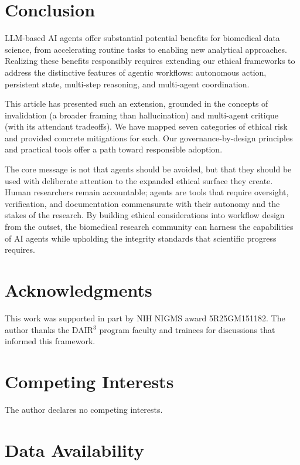 \documentclass[11pt,letterpaper]{article}
\newcommand{\DAIR}{DAIR$^3$}
\begin{document}
\section{Conclusion}
\label{sec:conclusion}

LLM-based AI agents offer substantial potential benefits for biomedical data science, from accelerating routine tasks to enabling new analytical approaches. Realizing these benefits responsibly requires extending our ethical frameworks to address the distinctive features of agentic workflows: autonomous action, persistent state, multi-step reasoning, and multi-agent coordination.

This article has presented such an extension, grounded in the concepts of invalidation (a broader framing than hallucination) and multi-agent critique (with its attendant tradeoffs). We have mapped seven categories of ethical risk and provided concrete mitigations for each. Our governance-by-design principles and practical tools offer a path toward responsible adoption.

The core message is not that agents should be avoided, but that they should be used with deliberate attention to the expanded ethical surface they create. Human researchers remain accountable; agents are tools that require oversight, verification, and documentation commensurate with their autonomy and the stakes of the research. By building ethical considerations into workflow design from the outset, the biomedical research community can harness the capabilities of AI agents while upholding the integrity standards that scientific progress requires.

\section*{Acknowledgments}

This work was supported in part by NIH NIGMS award 5R25GM151182. The author thanks the \DAIR{} program faculty and trainees for discussions that informed this framework.

\section*{Competing Interests}

The author declares no competing interests.

\section*{Data Availability}
\end{document}
